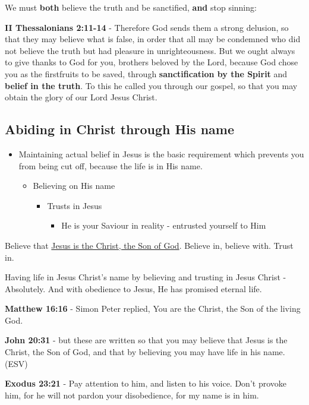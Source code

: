 \documentclass[11pt]{article}
\begin{document}
We must \textbf{both} believe the truth and be sanctified, \textbf{and} stop sinning:

\textbf{II Thessalonians 2:11-14} - Therefore God sends them a strong delusion, so that they may believe what is false, in order that all may be condemned who did not believe the truth but had pleasure in unrighteousness. But we ought always to give thanks to God for you, brothers beloved by the Lord, because God chose you as the firstfruits to be saved, through \textbf{sanctification by the Spirit} and \textbf{belief in the truth}. To this he called you through our gospel, so that you may obtain the glory of our Lord Jesus Christ.

\subsection{Abiding in Christ through His name}
\label{sec:org3864205}
\begin{itemize}
\item Maintaining actual belief in Jesus is the basic requirement which prevents you from being cut off, because the life is in His name.
\begin{itemize}
\item Believing on His name
\begin{itemize}
\item Trusts in Jesus
\begin{itemize}
\item He is your Saviour in reality - entrusted yourself to Him
\end{itemize}
\end{itemize}
\end{itemize}
\end{itemize}

Believe that \uline{Jesus is the Christ, the Son of God}. Believe in, believe with. Trust in.

Having life in Jesus Christ's name by believing and trusting in Jesus Christ - Absolutely.
And with obedience to Jesus, He has promised eternal life.

\textbf{Matthew 16:16} - Simon Peter replied, You are the Christ, the Son of the living God.

\textbf{John 20:31} - but these are written so that you may believe that Jesus is the Christ, the Son of God, and that by believing you may have life in his name. (ESV)

\textbf{Exodus 23:21} - Pay attention to him, and listen to his voice. Don't provoke him, for he will not pardon your disobedience, for my name is in him.
\end{document}
